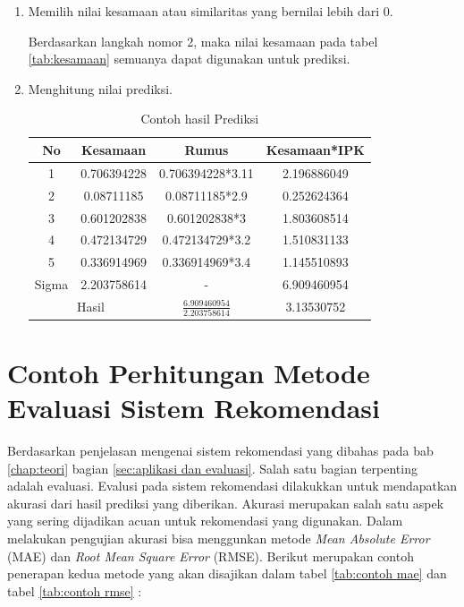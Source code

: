 \begin{enumerate}
    \item Memilih nilai kesamaan atau similaritas yang bernilai lebih dari 0.
    
    Berdasarkan langkah nomor 2, maka nilai kesamaan pada tabel \ref{tab:kesamaan} semuanya dapat digunakan untuk prediksi.
    
    \item Menghitung nilai prediksi.
    
    \begin{table}[H]
        \centering
        \renewcommand{\arraystretch}{1.5}
        \begin{tabular}{|c|c|c|c|}
            \hline
            No & Kesamaan & Rumus & Kesamaan*IPK \\
            \hline
            1 & 0.706394228 & 0.706394228*3.11 & 2.196886049 \\
            \hline
            2 & 0.08711185 & 0.08711185*2.9 &  0.252624364 \\
            \hline
            3 & 0.601202838 & 0.601202838*3 & 1.803608514 \\
            \hline
            4 & 0.472134729 & 0.472134729*3.2 & 1.510831133 \\
            \hline
            5 & 0.336914969 & 0.336914969*3.4 & 1.145510893 \\
            \hline
            Sigma & 2.203758614 & - & 6.909460954 \\
            \hline
            \multicolumn{2}{|c|}{Hasil} & $\frac{6.909460954}{2.203758614}$ & 3.13530752\\
            \hline
        \end{tabular}
        \caption{Contoh hasil Prediksi}
        \label{tab:prediksi}
    \end{table}
\end{enumerate}

\section{Contoh Perhitungan Metode Evaluasi Sistem Rekomendasi}
\label{sec:contoh perhitungan evaluasi}

Berdasarkan penjelasan mengenai sistem rekomendasi yang dibahas pada bab \ref{chap:teori} bagian \ref{sec:aplikasi dan evaluasi}. Salah satu bagian terpenting adalah evaluasi. Evalusi pada sistem rekomendasi dilakukkan untuk mendapatkan akurasi dari hasil prediksi yang diberikan. Akurasi merupakan salah satu aspek yang sering dijadikan acuan untuk rekomendasi yang digunakan. Dalam melakukan pengujian akurasi bisa menggunkan metode \textit{Mean Absolute Error} (MAE) dan \textit{Root Mean Square Error} (RMSE). Berikut merupakan contoh penerapan kedua metode yang akan disajikan dalam tabel \ref{tab:contoh mae} dan tabel \ref{tab:contoh rmse} :

